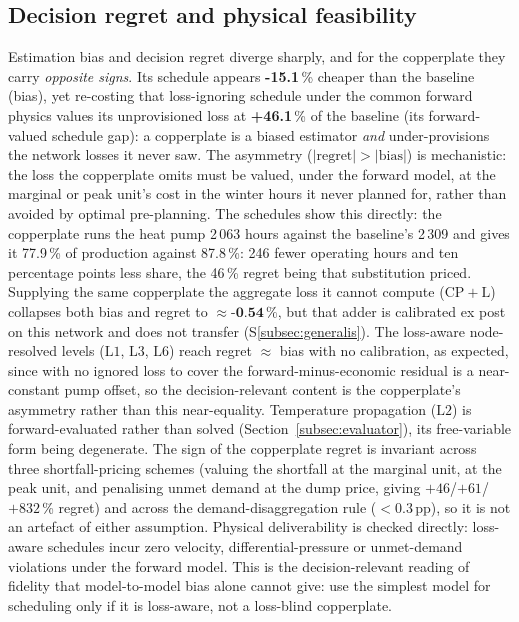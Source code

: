 \documentclass[a4paper,fleqn]{cas-sc}
\newcommand{\CPL}{\ensuremath{\mathrm{CP{+}L}}} %
\newcommand{\Lone}{\ensuremath{\mathrm{L1}}}    %
\newcommand{\Ltwo}{\ensuremath{\mathrm{L2}}}    %
\newcommand{\Lthree}{\ensuremath{\mathrm{L3}}}  %
\newcommand{\Lsix}{\ensuremath{\mathrm{L6}}}    %
\begin{document}
\subsection{Decision regret and physical feasibility}
Estimation bias and decision regret diverge sharply, and for the copperplate they
carry \emph{opposite signs}. Its schedule appears \textbf{-15.1}\,\% cheaper
than the baseline (bias), yet re-costing that loss-ignoring schedule under the common
forward physics values its unprovisioned loss at \textbf{+46.1}\,\% of the baseline
(its forward-valued schedule gap): a copperplate is a biased estimator \emph{and}
under-provisions the network losses it never saw. The asymmetry
($|\text{regret}|>|\text{bias}|$) is mechanistic: the loss the copperplate omits must
be valued, under the forward model, at the marginal or peak unit's cost in the winter
hours it never planned for, rather than avoided by optimal pre-planning. The schedules show this directly: the copperplate runs the heat pump 2\,063 hours against the baseline's 2\,309 and gives it 77.9\,\% of production against 87.8\,\%: 246 fewer operating hours and ten percentage points less share, the 46\,\% regret being that substitution priced. Supplying the same
copperplate the aggregate loss it cannot compute (\CPL) collapses both bias and regret
to $\approx\textbf{-0.54}\,\%$, but that adder is calibrated ex post on this
network and does not transfer (S\ref{subsec:generalis}). The loss-aware node-resolved levels
(\Lone, \Lthree, \Lsix) reach regret $\approx$ bias with no calibration, as expected, since with
no ignored loss to cover the forward-minus-economic residual is a near-constant pump offset, so
the decision-relevant content is the copperplate's asymmetry rather than this near-equality.
Temperature propagation (\Ltwo) is forward-evaluated rather than solved (Section~\ref{subsec:evaluator}), its
free-variable form being degenerate. The sign of the
copperplate regret is invariant across three shortfall-pricing schemes (valuing the shortfall at
the marginal unit, at the peak unit, and penalising unmet demand at the dump price, giving
$+46$/$+61$/$+832$\,\% regret) and across the demand-disaggregation rule
($<0.3$\,pp), so it is not an artefact of either assumption. Physical deliverability is
checked directly: loss-aware schedules incur zero velocity, differential-pressure or
unmet-demand violations under the forward model. This is the decision-relevant reading of
fidelity that model-to-model bias alone cannot give: use the simplest model for
scheduling only if it is loss-aware, not a loss-blind copperplate.
\end{document}

